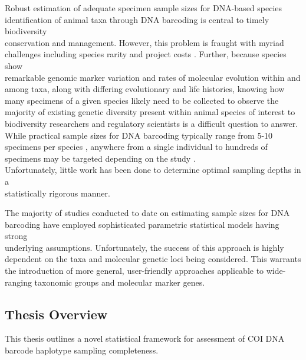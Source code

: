 \vspace{5mm}

Robust estimation of adequate specimen sample sizes for DNA-based species \\ identification of animal taxa through DNA barcoding is central to timely biodiversity \\ conservation and management. However, this problem is fraught with myriad challenges including species rarity and project costs \cite{cameron2006will, stein2014is}. Further, because species show \\ remarkable genomic marker variation and rates of molecular evolution within and among taxa, along with differing evolutionary and life histories, knowing how many specimens of a given species likely need to be collected to observe the majority of existing genetic diversity present within animal species of interest to biodiversity researchers and regulatory scientists is a difficult question to answer. While practical sample sizes for DNA barcoding typically range from 5-10 specimens per species \cite{zhang2010estimating}, anywhere from a single individual to hundreds of specimens may be targeted depending on the study \cite{hajibabaei2007dna, matz2005likelihood, zhang2010estimating}. \\ Unfortunately, little work has been done to determine optimal sampling depths in a \\ statistically rigorous manner. 

\vspace{5mm}

The majority of studies conducted to date on estimating sample sizes for DNA \\ barcoding have employed sophisticated parametric statistical models having strong \\ underlying assumptions. Unfortunately, the success of this approach is highly dependent on the taxa and molecular genetic loci being considered. This warrants the introduction of more general, user-friendly approaches applicable to wide-ranging taxonomic groups and molecular marker genes. 

\vspace{5mm}

\subsection{Thesis Overview} \label{sec:intro1}

This thesis outlines a novel statistical framework for assessment of COI DNA barcode haplotype sampling completeness. 

